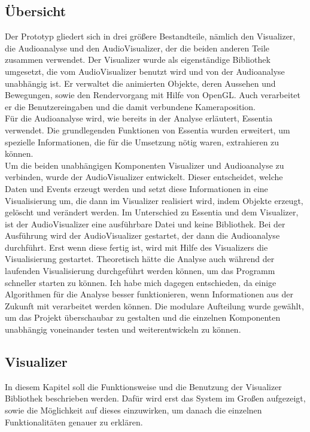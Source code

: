\documentclass[11pt,a4paper]{article}
\begin{document}
\subsection{Übersicht}
Der Prototyp gliedert sich in drei größere Bestandteile, nämlich den Visualizer, die Audioanalyse und den AudioVisualizer, der die beiden anderen Teile zusammen verwendet. Der Visualizer wurde als eigenständige Bibliothek umgesetzt, die vom AudioVisualizer benutzt wird und von der Audioanalyse unabhängig ist. Er verwaltet die animierten Objekte, deren Aussehen und Bewegungen, sowie den Rendervorgang mit Hilfe von OpenGL. Auch verarbeitet er die Benutzereingaben und die damit verbundene Kameraposition.\\
Für die Audioanalyse wird, wie bereits in der Analyse erläutert, Essentia verwendet. Die grundlegenden Funktionen von Essentia wurden erweitert, um spezielle Informationen, die für die Umsetzung nötig waren, extrahieren zu können.\\
Um die beiden unabhängigen Komponenten Visualizer und Audioanalyse zu verbinden, wurde der AudioVisualizer entwickelt. Dieser entscheidet, welche Daten und Events erzeugt werden und setzt diese Informationen in eine Visualisierung um, die dann im Visualizer realisiert wird, indem Objekte erzeugt, gelöscht und verändert werden. Im Unterschied zu Essentia und dem Visualizer, ist der AudioVisualizer eine ausführbare Datei und keine Bibliothek. Bei der Ausführung wird der AudioVisualizer gestartet, der dann die Audioanalyse durchführt. Erst wenn diese fertig ist, wird mit Hilfe des Visualizers die Visualisierung gestartet. Theoretisch hätte die Analyse auch während der laufenden Visualisierung durchgeführt werden können, um das Programm schneller starten zu können. Ich habe mich dagegen entschieden, da einige Algorithmen für die Analyse besser funktionieren, wenn Informationen aus der Zukunft mit verarbeitet werden können. Die modulare Aufteilung wurde gewählt, um das Projekt überschaubar zu gestalten und die einzelnen Komponenten unabhängig voneinander testen und weiterentwickeln zu können.

\newpage
\subsection{Visualizer}
In diesem Kapitel soll die Funktionsweise und die Benutzung der Visualizer Bibliothek beschrieben werden. Dafür wird erst das System im Großen aufgezeigt, sowie die Möglichkeit auf dieses einzuwirken, um danach die einzelnen Funktionalitäten genauer zu erklären.
\end{document}
